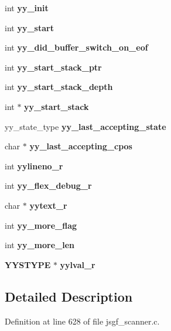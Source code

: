 \begin{DoxyCompactItemize}
\mbox{\label{structyyguts__t_abbef56b2d8359f6a15629c104f5dd030}} 
int {\bfseries yy\+\_\+init}
\item 
\mbox{\label{structyyguts__t_a8baf7d47fe53035d9bc2a9670795ff01}} 
int {\bfseries yy\+\_\+start}
\item 
\mbox{\label{structyyguts__t_a2daec411627700709ef2fd927e69627d}} 
int {\bfseries yy\+\_\+did\+\_\+buffer\+\_\+switch\+\_\+on\+\_\+eof}
\item 
\mbox{\label{structyyguts__t_ad9e132dacc2904a8ae76c64c72e33795}} 
int {\bfseries yy\+\_\+start\+\_\+stack\+\_\+ptr}
\item 
\mbox{\label{structyyguts__t_a35bedf1c17debd766565b99c39132eb4}} 
int {\bfseries yy\+\_\+start\+\_\+stack\+\_\+depth}
\item 
\mbox{\label{structyyguts__t_af6e2e45a5fdba0f313c680b35da4292a}} 
int $\ast$ {\bfseries yy\+\_\+start\+\_\+stack}
\item 
\mbox{\label{structyyguts__t_a84e01a3658729e9d69f79feb3faf1c99}} 
yy\+\_\+state\+\_\+type {\bfseries yy\+\_\+last\+\_\+accepting\+\_\+state}
\item 
\mbox{\label{structyyguts__t_a46fb8d232ed375921af0b37caeeb67c4}} 
char $\ast$ {\bfseries yy\+\_\+last\+\_\+accepting\+\_\+cpos}
\item 
\mbox{\label{structyyguts__t_aa9f13776b8d311e847cc7d974d49af4c}} 
int {\bfseries yylineno\+\_\+r}
\item 
\mbox{\label{structyyguts__t_a5ad72d75ed6d693824fe7e02ce21118e}} 
int {\bfseries yy\+\_\+flex\+\_\+debug\+\_\+r}
\item 
\mbox{\label{structyyguts__t_aebaa731ad6cbe2411d104925e5bb3f2c}} 
char $\ast$ {\bfseries yytext\+\_\+r}
\item 
\mbox{\label{structyyguts__t_a664a72171cc3e720fcb8120af9b72883}} 
int {\bfseries yy\+\_\+more\+\_\+flag}
\item 
\mbox{\label{structyyguts__t_a683563bf4cd73f25b4c7b78579c1330e}} 
int {\bfseries yy\+\_\+more\+\_\+len}
\item 
\mbox{\label{structyyguts__t_a55dbdcd46a36d34adcbfc29be44d10cf}} 
\textbf{ Y\+Y\+S\+T\+Y\+PE} $\ast$ {\bfseries yylval\+\_\+r}
\end{DoxyCompactItemize}


\subsection{Detailed Description}


Definition at line 628 of file jsgf\+\_\+scanner.\+c.




